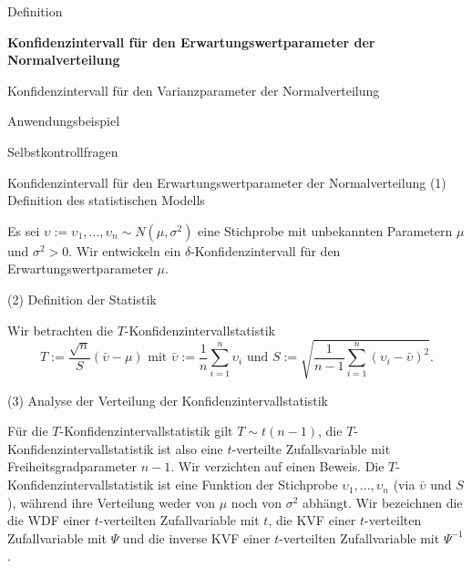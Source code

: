 \documentclass[
  8pt,
  ignorenonframetext,
]{beamer}
\newcommand{\ups} {\upsilon}
\begin{document}
\begin{frame}{}
\protect\hypertarget{section-7}{}
\large

Definition

\normalsize

\textbf{Konfidenzintervall für den Erwartungswertparameter der
Normalverteilung}

\large

Konfidenzintervall für den Varianzparameter der Normalverteilung

Anwendungsbeispiel

Selbstkontrollfragen
\end{frame}

\begin{frame}{Konfidenzintervall für den Erwartungswertparameter der
Normalverteilung}
\protect\hypertarget{konfidenzintervall-fuxfcr-den-erwartungswertparameter-der-normalverteilung}{}
\noindent (1) Definition des statistischen Modells

\small

Es sei \(\ups := \ups_1,...,\ups_n \sim N(\mu,\sigma^2)\) eine
Stichprobe mit unbekannten Parametern \(\mu\) und \(\sigma^2 > 0\). Wir
entwickeln ein \(\delta\)-Konfidenzintervall für den
Erwartungswertparameter \(\mu\). \vspace{2mm}

\normalsize

\noindent (2) Definition der Statistik \small

Wir betrachten die \(T\)-Konfidenzintervallstatistik \begin{equation}
T := \frac{\sqrt{n}}{S}(\bar{\ups} - \mu) \mbox{ mit } \bar{\ups} := \frac{1}{n}\sum_{i=1}^n \ups_i \mbox{  und } S := \sqrt{\frac{1}{n-1}\sum_{i=1}^n(\ups_i - \bar{\ups})^2}.
\end{equation}

\normalsize

\noindent (3) Analyse der Verteilung der Konfidenzintervallstatistik

\small

Für die \(T\)-Konfidenzintervallstatistik gilt \(T \sim t(n - 1)\), die
\(T\)-Konfidenzintervallstatistik ist also eine \(t\)-verteilte
Zufallsvariable mit Freiheitsgradparameter \(n-1\). Wir verzichten auf
einen Beweis. Die \(T\)-Konfidenzintervallstatistik ist eine Funktion
der Stichprobe \(\ups_1,...,\ups_n\) (via \(\bar{\ups}\) und \(S\)),
während ihre Verteilung weder von \(\mu\) noch von \(\sigma^2\) abhängt.
Wir bezeichnen die die WDF einer \(t\)-verteilten Zufallvariable mit
\(t\), die KVF einer \(t\)-verteilten Zufallvariable mit \(\Psi\) und
die inverse KVF einer \(t\)-verteilten Zufallvariable mit \(\Psi^{-1}\).
\end{frame}
\end{document}
